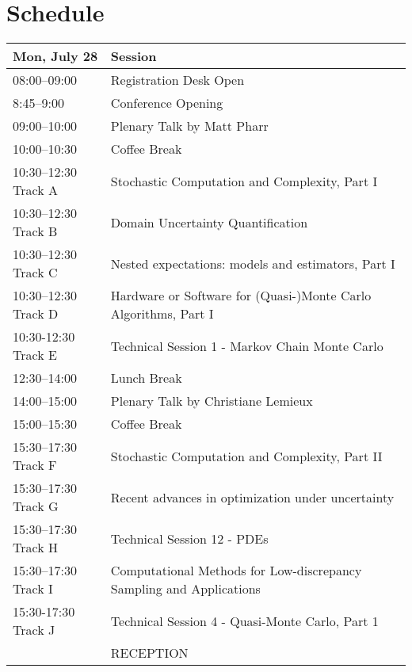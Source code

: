 \chapter{Schedule}
\begin{table}
\begin{tabularx}{\textwidth}{>{\hsize=0.5\hsize}X|>{\hsize=1.5\hsize}X}
\hline
\textbf{Mon, July 28} & \textbf{Session} \\
\hline
\cellcolor{\EmptyColor}08:00–09:00 & \cellcolor{\EmptyColor}Registration Desk Open \\
\cellcolor{\EmptyColor}8:45–9:00 & \cellcolor{\EmptyColor}Conference Opening \\
\cellcolor{\PlenaryColor}09:00–10:00 & \cellcolor{\PlenaryColor}Plenary Talk by Matt Pharr \\
\cellcolor{\EmptyColor}10:00–10:30 & \cellcolor{\EmptyColor}Coffee Break \\
\cellcolor{\SessionTitleColor}10:30–12:30 Track A & \cellcolor{\SessionTitleColor}Stochastic Computation and Complexity, Part I \\
\cellcolor{\SessionTitleColor}10:30–12:30 Track B & \cellcolor{\SessionTitleColor}Domain Uncertainty Quantification \\
\cellcolor{\SessionTitleColor}10:30–12:30 Track C & \cellcolor{\SessionTitleColor}Nested expectations: models and estimators, Part I \\
\cellcolor{\SessionTitleColor}10:30–12:30 Track D & \cellcolor{\SessionTitleColor}Hardware or Software for (Quasi-)Monte Carlo Algorithms, Part I \\
\cellcolor{\SessionLightColor}10:30-12:30 Track E & \cellcolor{\SessionLightColor}Technical Session 1 - Markov Chain Monte Carlo \\
\cellcolor{\EmptyColor}12:30–14:00 & \cellcolor{\EmptyColor}Lunch Break \\
\cellcolor{\PlenaryColor}14:00–15:00 & \cellcolor{\PlenaryColor}Plenary Talk by Christiane Lemieux \\
\cellcolor{\EmptyColor}15:00–15:30 & \cellcolor{\EmptyColor}Coffee Break \\
\cellcolor{\SessionTitleColor}15:30–17:30 Track F & \cellcolor{\SessionTitleColor}Stochastic Computation and Complexity, Part II \\
\cellcolor{\SessionTitleColor}15:30–17:30 Track G & \cellcolor{\SessionTitleColor}Recent advances in optimization under uncertainty \\
\cellcolor{\SessionLightColor}15:30–17:30 Track H & \cellcolor{\SessionLightColor}Technical Session 12 - PDEs \\
\cellcolor{\SessionTitleColor}15:30–17:30 Track I & \cellcolor{\SessionTitleColor}Computational Methods for Low-discrepancy Sampling and Applications \\
\cellcolor{\SessionLightColor}15:30-17:30 Track J & \cellcolor{\SessionLightColor}Technical Session 4 - Quasi-Monte Carlo, Part 1 \\
\cellcolor{\EmptyColor} & \cellcolor{\EmptyColor}RECEPTION \\
\hline
\end{tabularx}
\end{table}

